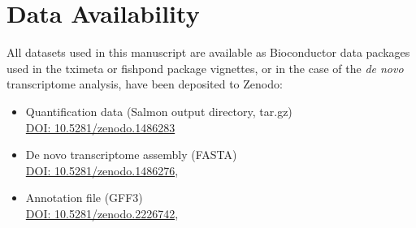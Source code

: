 \section*{Data Availability}

All datasets used in this manuscript are available as Bioconductor
data packages used in the tximeta or fishpond package vignettes, or
in the case of the \textit{de novo} transcriptome analysis, have been
deposited to Zenodo: 

\begin{itemize}
  \item Quantification data (Salmon output directory, tar.gz) \cite{killi-quant} \\
    \href{https://doi.org/10.5281/zenodo.1486283}{DOI: 10.5281/zenodo.1486283}
  \item De novo transcriptome assembly (FASTA) \cite{killi-fasta} \\
    \href{https://doi.org/10.5281/zenodo.1486276}{DOI: 10.5281/zenodo.1486276},
  \item Annotation file (GFF3) \cite{killi-gff} \\
    \href{https://doi.org/10.5281/zenodo.2226742}{DOI: 10.5281/zenodo.2226742},
\end{itemize}
